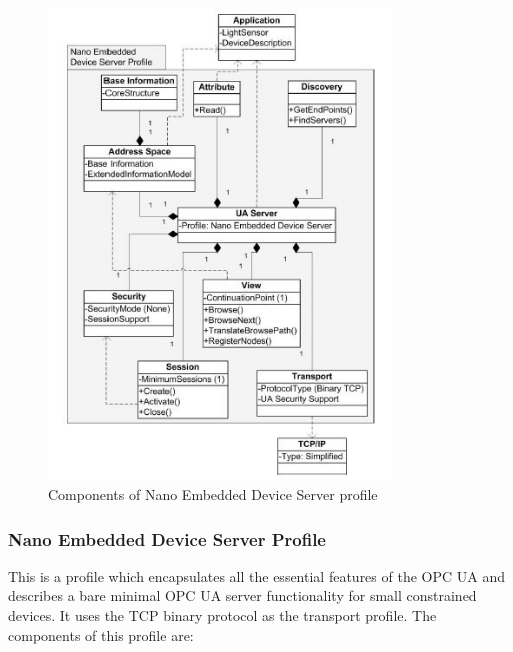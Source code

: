 \documentclass[conference]{IEEEtran}
\begin{document}
\begin{figure}[ht]
\centering
\includegraphics[height=125mm]{Figures/nano_embeddedSP}\quad
\caption[Subfigure example]{\label{f:nano_embeddedSP}Components of Nano Embedded Device Server profile}
\end{figure}


\subsubsection{Nano Embedded Device Server Profile}
This is a profile which encapsulates all the essential features of the OPC UA and describes a bare minimal OPC UA server functionality for small constrained devices. It uses the TCP binary protocol as the transport profile.
The components of this profile are:
\end{document}
